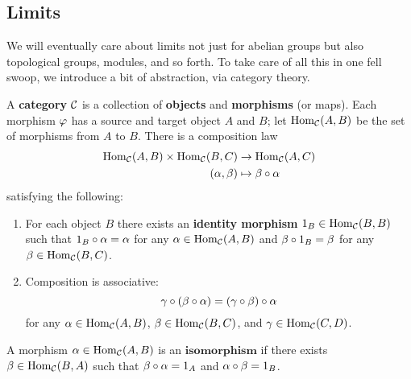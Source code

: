 \subsection{Limits}
We will eventually care about limits not just for abelian groups but also topological groups, modules, and so forth. To take care of all this in one fell swoop, we introduce a bit of abstraction, via category theory.
\begin{df}
A \textbf{category} $\cal C$ is a collection of \textbf{objects} and \textbf{morphisms} (or maps). Each morphism $\ph$ has a source and target object $A$ and $B$; let $\Hom_{\cal C}(A,B)$ be the set of morphisms from $A$ to $B$. There is a composition law
\begin{align*}
\Hom_{\cal C}(A,B)\times \Hom_{\cal C}(B,C)&\to \Hom_{\cal C}(A,C)\\
(\al,\be)&\mapsto \be \circ \al
\end{align*}
satisfying the following:
\begin{enumerate}
\item
For each object $B$ there exists an \textbf{identity morphism} $1_B\in \Hom_{\cal C}(B,B)$ such that $1_B\circ \al=\al$ for any $\al\in \Hom_{\cal C}(A,B)$ and $\be\circ 1_B=\be$ for any $\be\in \Hom_{\cal C}(B,C)$.
\item Composition is associative:
\[
\ga\circ (\be \circ \al)=(\ga\circ \be)\circ \al
\]
for any $\al\in \Hom_{\cal C}(A,B)$, $\be\in \Hom_{\cal C}(B,C)$, and $\ga\in \Hom_{\cal C}(C,D)$.
\end{enumerate}

A morphism $\al\in\Hom_{\cal C}(A,B)$ is an $\textbf{isomorphism}$ if there exists $\be\in \Hom_{\cal C}(B,A)$ such that $\be\circ \al=1_A$ and $\al\circ \be=1_B$.
\end{df}

